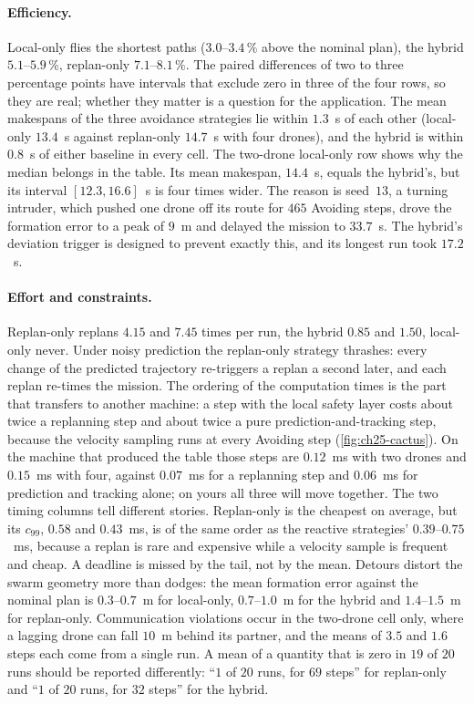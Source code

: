 \paragraph{Efficiency.}
Local-only flies the shortest paths ($3.0$--$3.4\,\%$ above the nominal
plan), the hybrid $5.1$--$5.9\,\%$, replan-only $7.1$--$8.1\,\%$. The paired
differences of two to three percentage points have intervals that exclude
zero in three of the four rows, so they are real; whether they matter is a
question for the application. The mean makespans of the three avoidance
strategies lie within $1.3$~s of each other (local-only $13.4$~s against
replan-only $14.7$~s with four drones), and the hybrid is within $0.8$~s of
either baseline in every cell. The two-drone local-only row shows why the
median belongs in the table. Its mean makespan, $14.4$~s, equals the
hybrid's, but its interval $[12.3, 16.6]$~s is four times wider. The reason
is seed~$13$, a turning intruder, which pushed one drone off its route for
$465$ Avoiding steps, drove the formation error to a peak of $9$~m and
delayed the mission to $33.7$~s. The
hybrid's deviation trigger is designed to prevent exactly this, and its
longest run took $17.2$~s.

\paragraph{Effort and constraints.}
Replan-only replans $4.15$ and $7.45$ times per run, the hybrid $0.85$ and
$1.50$, local-only never. Under noisy prediction the replan-only strategy
thrashes: every change of the predicted trajectory re-triggers a replan a
second later, and each replan re-times the mission. The ordering of the
computation times is the part that transfers to another machine: a step with
the local safety layer costs about twice a replanning step and about twice a pure
prediction-and-tracking step, because the velocity sampling runs at every
Avoiding step (\cref{fig:ch25-cactus}). On the machine that produced the
table those steps are $0.12$~ms with two drones and $0.15$~ms with four,
against $0.07$~ms for a replanning step and $0.06$~ms for prediction and
tracking alone; on yours all three will move together. The two timing
columns tell different stories. Replan-only is the cheapest on average, but
its $c_{99}$, $0.58$ and $0.43$~ms, is of the same order as the reactive
strategies' $0.39$--$0.75$~ms, because a replan is rare and expensive while
a velocity sample is frequent and cheap. A deadline is missed by the tail,
not by the mean. Detours
distort the swarm geometry more than dodges: the mean formation error against
the nominal plan is $0.3$--$0.7$~m for local-only, $0.7$--$1.0$~m for the
hybrid and $1.4$--$1.5$~m for replan-only. Communication violations occur in
the two-drone cell only, where a lagging drone can fall $10$~m behind its
partner, and the means of $3.5$ and $1.6$ steps each come from a single run.
A mean of a quantity that is zero in $19$ of $20$ runs should be reported
differently: ``$1$ of $20$ runs, for $69$ steps'' for replan-only and
``$1$ of $20$ runs, for $32$ steps'' for the hybrid.

